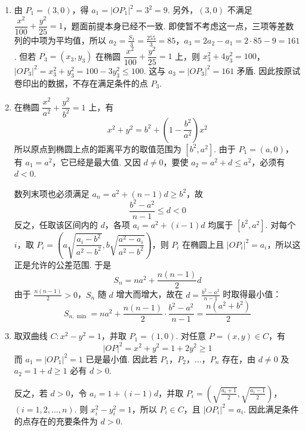 \begin{solution}
\begin{enumerate}
\item 由 \(P_{1}=(3,0)\)，得 \(a_{1}=|OP_{1}|^{2}=3^{2}=9\). 另外，\((3,0)\) 不满足 \(\dfrac{x^{2}}{100}+\dfrac{y^{2}}{25}=1\)，题面前提本身已经不一致. 即使暂不考虑这一点，三项等差数列的中项为平均值，所以
\(a_{2}=\frac{S_{3}}{3}=\frac{255}{3}=85\)，\(a_{3}=2a_{2}-a_{1}=2\cdot85-9=161\).
但若 \(P_{3}=(x_{3},y_{3})\) 在椭圆 \(\dfrac{x^{2}}{100}+\dfrac{y^{2}}{25}=1\) 上，则
\(x_{3}^{2}+4y_{3}^{2}=100\)，\(|OP_{3}|^{2}=x_{3}^{2}+y_{3}^{2}=100-3y_{3}^{2}\leqslant100\).
这与 \(a_{3}=|OP_{3}|^{2}=161\) 矛盾. 因此按原试卷印出的数据，不存在满足条件的点 \(P_{3}\).

\item 在椭圆 \(\dfrac{x^{2}}{a^{2}}+\dfrac{y^{2}}{b^{2}}=1\) 上，有
\[
x^{2}+y^{2}=b^{2}+\left(1-\frac{b^{2}}{a^{2}}\right)x^{2}
\]
所以原点到椭圆上点的距离平方的取值范围为 \([b^{2},a^{2}]\). 由于 \(P_{1}=(a,0)\)，有 \(a_{1}=a^{2}\)，它已经是最大值. 又因 \(d\neq0\)，要使 \(a_{2}=a^{2}+d\leqslant a^{2}\)，必须有 \(d<0\).

数列末项也必须满足 \(a_{n}=a^{2}+(n-1)d\geqslant b^{2}\)，故
\[
\frac{b^{2}-a^{2}}{n-1}\leqslant d<0
\]
反之，任取该区间内的 \(d\)，各项 \(a_{i}=a^{2}+(i-1)d\) 均属于 \([b^{2},a^{2}]\). 对每个 \(i\)，取
\(P_{i}=\left(a\sqrt{\dfrac{a_{i}-b^{2}}{a^{2}-b^{2}}},b\sqrt{\dfrac{a^{2}-a_{i}}{a^{2}-b^{2}}}\right)\)，则 \(P_{i}\) 在椭圆上且 \(\left|OP_{i}\right|^{2}=a_{i}\)，所以这正是允许的公差范围. 于是
\[
S_{n}=na^{2}+\frac{n(n-1)}{2}d
\]
由于 \(\frac{n(n-1)}{2}>0\)，\(S_{n}\) 随 \(d\) 增大而增大，故在 \(d=\frac{b^{2}-a^{2}}{n-1}\) 时取得最小值：
\[
S_{n,\min}=na^{2}+\frac{n(n-1)}{2}\cdot\frac{b^{2}-a^{2}}{n-1}=\frac{n(a^{2}+b^{2})}{2}
\]

\item 取双曲线 \(C\colon x^{2}-y^{2}=1\)，并取 \(P_{1}=(1,0)\). 对任意 \(P=(x,y)\in C\)，有
\[
|OP|^{2}=x^{2}+y^{2}=1+2y^{2}\geqslant1
\]
而 \(a_{1}=|OP_{1}|^{2}=1\) 已是最小值. 因此若 \(P_{1}\)，\(P_{2}\)，\(\ldots\)，\(P_{n}\) 存在，由 \(d\neq0\) 及 \(a_{2}=1+d\geqslant1\) 必有 \(d>0\).

反之，若 \(d>0\)，令 \(a_{i}=1+(i-1)d\)，并取
\(P_{i}=\left(\sqrt{\frac{a_{i}+1}{2}},\sqrt{\frac{a_{i}-1}{2}}\right)\)，\((i=1,2,\ldots,n)\).
则 \(x_{i}^{2}-y_{i}^{2}=1\)，所以 \(P_{i}\in C\)，且 \(|OP_{i}|^{2}=a_{i}\). 因此满足条件的点存在的充要条件为 \(d>0\).
\end{enumerate}
\end{solution}
